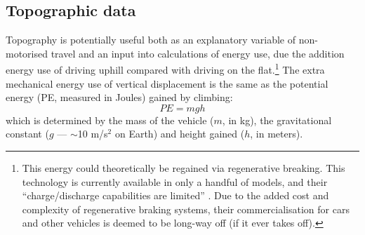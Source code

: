 \subsection{Topographic data}
Topography is potentially useful both as an explanatory variable of
non-motorised travel and an input into calculations of energy use, due the
addition energy use of driving
uphill compared with driving on the flat.\footnote{This
energy could theoretically
be regained via regenerative breaking. This technology is currently available
in  only a handful of models, and their ``charge/discharge capabilities are
limited'' \citep{Clarke2010}. Due to the added cost and complexity of
regenerative braking systems, their commercialisation for cars and other
vehicles is deemed to be long-way off (if it ever takes off).
}
The extra mechanical energy use of vertical displacement is the same as the
potential energy (PE, measured in Joules) gained by climbing:
\begin{equation}
 PE = mgh
\end{equation}
which is determined by the mass of the vehicle ($m$, in kg), the gravitational
constant ($g$ --- $\sim$10 m/s$^2$ on Earth) and height gained ($h$, in meters).

